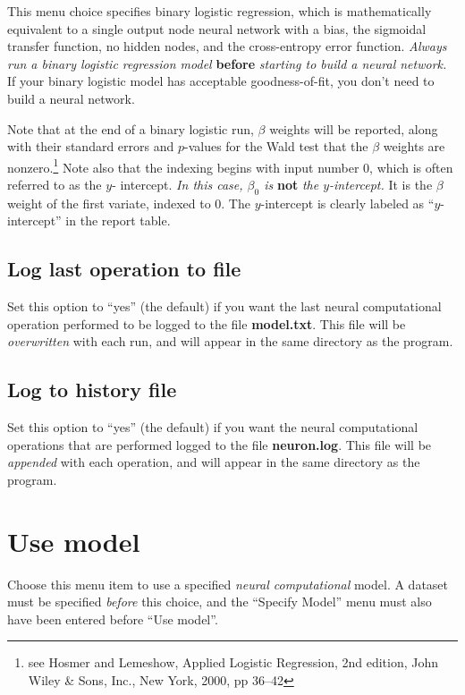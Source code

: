 This menu choice specifies binary logistic regression, which is
mathematically equivalent to a single output node neural network with
a bias, the sigmoidal transfer function, no hidden nodes, and the
cross-entropy error function. {\em \beginred Always run a binary
logistic regression model} {\bf before} {\em starting to build a
neural network. \endcolor}  If your binary logistic model has
acceptable goodness-of-fit, you don't need to build a neural network.

Note that at the end of a binary logistic run, $\beta$ weights will be
reported, along with their standard errors and $p$-values for the Wald
test that the $\beta$ weights are nonzero.\footnote{see Hosmer and
Lemeshow, Applied Logistic Regression, 2nd edition, John Wiley \&
Sons, Inc., New York, 2000, pp 36--42}  Note also that the indexing
begins with input number 0, which is often referred to as the $y$-
intercept.  {\em \beginred In this case, $\beta_0$ is} {\bf not} {\em
the $y$-intercept. \endcolor}  It is the $\beta$ weight of the first
variate, indexed to 0.  The $y$-intercept is clearly labeled as
``$y$-intercept'' in the report table.

\subsection{Log last operation to file}

Set this option to ``yes'' (the default) if you want the last neural
computational operation performed to be logged to the file {\bf
model.txt}.  This file will be {\em overwritten} with each run, and
will appear in the same directory as the program.

\subsection{Log to history file}

Set this option to ``yes'' (the default) if you want the neural
computational operations that are performed logged to the file {\bf
neuron.log}.  This file will be {\em appended} with each operation,
and will appear in the same directory as the program.

\section{Use model}

Choose this menu item to use a specified {\em neural computational}
model.  A dataset must be specified {\em before} this choice, and the
``Specify Model'' menu must also have been entered before ``Use
model''.

